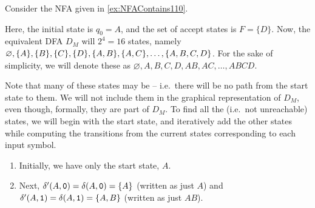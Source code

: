 \begin{Example}
Consider the NFA given in \cref{ex:NFAContains110}.
\begin{center}
\end{center}
Here, the initial state is $q_0 = A$, and the set of accept states is $F = \{D\}$. Now, the equivalent DFA $D_M$ will $2^4 = 16$ states, namely $\varnothing, \{A\}, \{B\}, \{C\}, \\ \{D\}, \{A, B\}, \{A, C\}, \ldots, \{A, B, C, D\}$. For the sake of simplicity, we will denote these as $\varnothing, A, B, C, D, AB, AC, \ldots, ABCD$.

Note that many of these states may be  -- i.e.\ there will be no path from the start state to them. We will not include them in the graphical representation of $D_M$, even though, formally, they are part of $D_M$. To find all the  (i.e.\ not unreachable) states, we will begin with the start state, and iteratively add the other states while computing the transitions from the current states corresponding to each input symbol.

\begin{enumerate}
\item Initially, we have only the start state, $A$.
\begin{center}
\end{center}

\item Next, $\delta'(A, \texttt 0) = \delta(A, \texttt 0) = \{A\}$ (written as just $A$) and $\delta'(A, \texttt  1) = \delta(A, \texttt  1) = \{A, B\}$ (written as just $AB$).
\begin{center}
\end{center}


\end{enumerate}
\end{Example}
